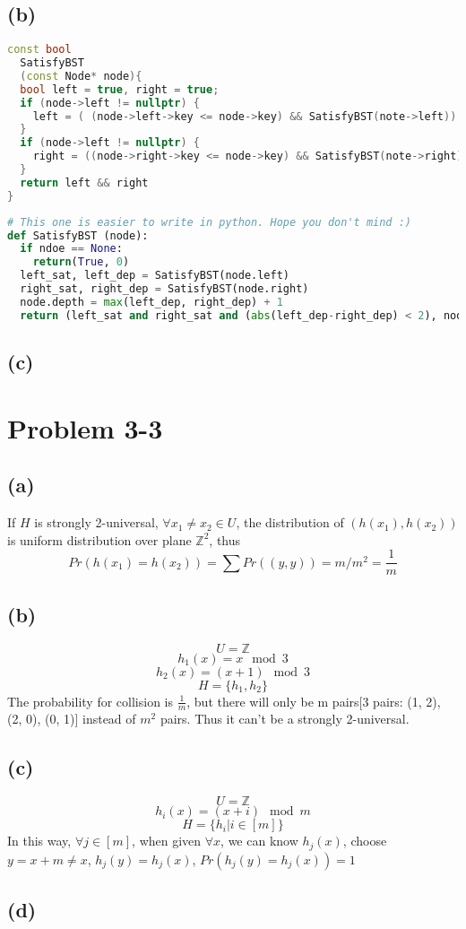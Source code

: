 \documentclass{article}
\begin{document}
  \subsection*{(b)}
\begin{lstlisting}[language = C++]
const bool
  SatisfyBST 
  (const Node* node){
  bool left = true, right = true;
  if (node->left != nullptr) {
    left = ( (node->left->key <= node->key) && SatisfyBST(note->left))
  } 
  if (node->left != nullptr) {
    right = ((node->right->key <= node->key) && SatisfyBST(note->right))
  } 
  return left && right
}
\end{lstlisting}   
\begin{lstlisting}[language = python]
# This one is easier to write in python. Hope you don't mind :)
def SatisfyBST (node):
  if ndoe == None:
    return(True, 0)
  left_sat, left_dep = SatisfyBST(node.left)
  right_sat, right_dep = SatisfyBST(node.right)
  node.depth = max(left_dep, right_dep) + 1
  return (left_sat and right_sat and (abs(left_dep-right_dep) < 2), node.depth)

\end{lstlisting}   
  
  \subsection*{(c)}



\section*{Problem 3-3}
  \subsection*{(a)}
    If $H$ is strongly 2-universal, $\forall x_1 \neq x_2 \in U$, the distribution of $(h(x_1), h(x_2))$ is uniform distribution over plane $\mathbb{Z}^2$, thus
    $$ Pr(h(x_1) = h(x_2)) = \sum Pr((y, y)) = m / m^2 = \frac{1}{m}$$
  \subsection*{(b)}
    $$ U = \mathbb{Z}$$
    $$h_1(x) = x \mod 3$$
    $$h_2(x) = (x+1) \mod 3$$
    $$H = \{h_1, h_2\}$$
    The probability for collision is $\frac{1}{m}$, but there will only be m pairs[3 pairs: (1, 2), (2, 0), (0, 1)] instead of $m^2$ pairs. Thus it can't be a strongly 2-universal.
  \subsection*{(c)}
    $$ U = \mathbb{Z}$$
    $$h_i(x) = (x+i) \mod m$$
    $$H = \{h_i | i \in [m]\}$$
    In this way, $\forall j \in [m]$, when given  $\forall x$, we can know $h_j(x)$, choose $y = x + m \neq x$, $h_j(y) = h_j(x)$, $Pr(h_j(y) = h_j(x)) = 1$

  \subsection*{(d)}
\end{document}
